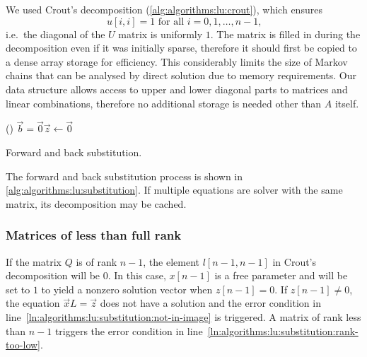 We used Crout's  decomposition
(\cref{alg:algorithms:lu:crout}), which ensures
\begin{equation}
  u[i, i] = 1 \text{ for all $i = 0, 1, \ldots, n - 1$,}
\end{equation}
i.e.~the diagonal of the $U$ matrix is uniformly $1$. The matrix is
filled in during the decomposition even if it was initially sparse,
therefore it should first be copied to a dense array storage for
efficiency. This considerably limits the size of Markov chains that
can be analysed by direct solution due to memory requirements. Our
data structure allows access to upper and lower diagonal parts to
matrices and linear combinations, therefore no additional storage is
needed other than $A$ itself.

\begin{algorithm}
  \;
  \lIf()
  {$\vec{b} = \vec{0}$}{$\vec{z} \gets \vec{0}$}
   
  \;
  \caption{Forward and back substitution.}
  \label{alg:algorithms:lu:substitution}
\end{algorithm}

The forward and back substitution process is shown in
\cref{alg:algorithms:lu:substitution}. If multiple equations are
solver with the same matrix, its  decomposition may be
cached.

\subsubsection{Matrices of less than full rank}

If the matrix $Q$ is of rank $n - 1$, the element $l[n - 1, n - 1]$ in
Crout's  decomposition will be $0$. In this case,
$x[n - 1]$ is a free parameter and will be set to $1$ to yield a
nonzero solution vector when $z[n - 1] = 0$. If $z[n - 1] \ne 0$, the
equation $\vec{x} L = \vec{z}$ does not have a solution and the error
condition in line~\ref{ln:algorithms:lu:substitution:not-in-image} is
triggered. A matrix of rank less than $n - 1$ triggers the error
condition in line~\ref{ln:algorithms:lu:substitution:rank-too-low}.

